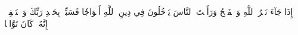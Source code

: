 إِذَا جَآءَ نَصۡرُ ٱللَّهِ وَٱلۡفَتۡحُ
وَرَأَيۡتَ ٱلنَّاسَ يَدۡخُلُونَ فِي دِينِ ٱللَّهِ أَفۡوَاجٗا
فَسَبِّحۡ بِحَمۡدِ رَبِّكَ وَٱسۡتَغۡفِرۡهُۚ إِنَّهُۥ كَانَ تَوَّابَۢا